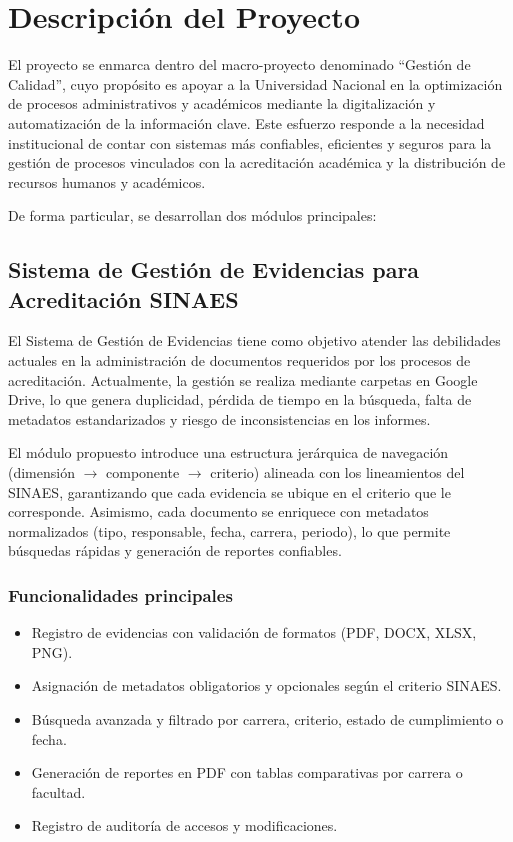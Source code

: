 \chapter{Descripción del Proyecto}

El proyecto se enmarca dentro del macro-proyecto denominado ``Gestión de Calidad'', cuyo propósito es apoyar a la Universidad Nacional en la optimización de procesos administrativos y académicos mediante la digitalización y automatización de la información clave. Este esfuerzo responde a la necesidad institucional de contar con sistemas más confiables, eficientes y seguros para la gestión de procesos vinculados con la acreditación académica y la distribución de recursos humanos y académicos.

De forma particular, se desarrollan dos módulos principales: 

\section*{Sistema de Gestión de Evidencias para Acreditación SINAES}

El Sistema de Gestión de Evidencias tiene como objetivo atender las debilidades actuales en la administración de documentos requeridos por los procesos de acreditación. Actualmente, la gestión se realiza mediante carpetas en Google Drive, lo que genera duplicidad, pérdida de tiempo en la búsqueda, falta de metadatos estandarizados y riesgo de inconsistencias en los informes.

El módulo propuesto introduce una estructura jerárquica de navegación (dimensión $\to$ componente $\to$ criterio) alineada con los lineamientos del SINAES, garantizando que cada evidencia se ubique en el criterio que le corresponde. Asimismo, cada documento se enriquece con metadatos normalizados (tipo, responsable, fecha, carrera, periodo), lo que permite búsquedas rápidas y generación de reportes confiables.

\subsection*{Funcionalidades principales}
\begin{itemize}
  \item Registro de evidencias con validación de formatos (PDF, DOCX, XLSX, PNG).
  \item Asignación de metadatos obligatorios y opcionales según el criterio SINAES.
  \item Búsqueda avanzada y filtrado por carrera, criterio, estado de cumplimiento o fecha.
  \item Generación de reportes en PDF con tablas comparativas por carrera o facultad.
  \item Registro de auditoría de accesos y modificaciones.
\end{itemize}

